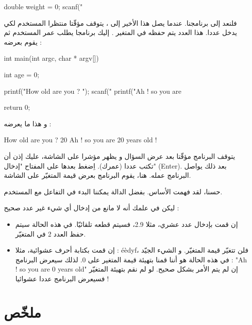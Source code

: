 \begin{Csource}
double weight = 0;
scanf("%
\end{Csource}

فلنعد إلى برنامجنا. عندما يصل هذا الأخير إلى
،
يتوقف مؤقّتا منتظرا المستخدم لكي يدخل عددا. هذا العدد يتم حفظه في المتغير
.
إليك برنامجا يطلب عمر المستخدم ثم يقوم بعرضه :

\begin{Csource}
int main(int argc, char * argv[])
{
  int age = 0;

  printf("How old are you ? ");
  scanf("%
  printf("Ah ! so you are %

  return 0;
}
\end{Csource}

و هذا ما يعرضه :

\begin{Console}
How old are you ? 20
Ah ! so you are 20 years old !

\end{Console}

يتوقف البرنامج مؤقّتا بعد عرض السؤال و يظهر مؤشرا على الشاشة، عليك إذن أن تكتب عددا (عمرك). اِضغط بعدها على المفتاح "إدخال"
(\textenglish{Enter}).
بعد ذلك يواصل البرنامج عمله. هنا، يقوم البرنامج بعرض قيمة المتغيّر
على الشاشة.

حسنا، لقد فهمت الأساس. بفضل الدالة
 يمكننا البدء في التفاعل مع المستخدم.

 ليكن في علمك أنه لا مانع من إدخال أي شيء غير عدد صحيح :
 
 \begin{itemize}
   \item إن قمت بإدخال عدد عشري، مثلا 2.9، فسيتم قطعه تلقائيّا. في هذه الحالة سيتم حفظ العدد 2 في المتغيّر.
   \item إن قمت بكتابة أحرف عشوائية، مثلا :
\textenglish{éèdyf}،
فلن تتغيّر قيمة المتغيّر. و الشيء الجيّد في هذه الحالة هو أننا قمنا بتهيئة قيمة المتغير على 0. لذلك سيعرض البرنامج :
"\textenglish{Ah ! so you are 0 years old}"
 إن لم يتم الأمر بشكل صحيح. لو لم نقم بتهيئة المتغيّر فسيعرض البرنامج عددا عشوائيا !
 \end{itemize}

\section*{ملخّص}

